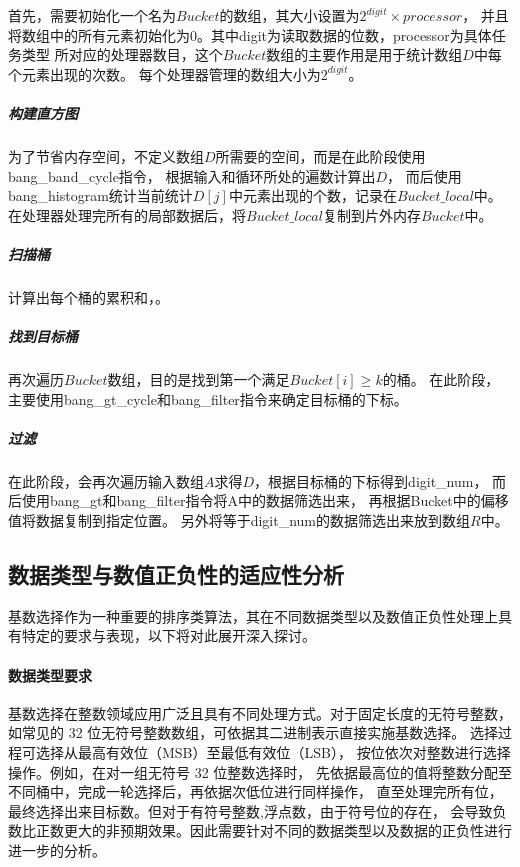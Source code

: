 首先，需要初始化一个名为\(Bucket\)的数组，其大小设置为\(2^{digit} \times processor\)，
并且将数组中的所有元素初始化为\(0\)。其中digit为读取数据的位数，processor为具体任务类型
所对应的处理器数目，这个\(Bucket\)数组的主要作用是用于统计数组\(D\)中每个元素出现的次数。
每个处理器管理的数组大小为\(2^{digit}\)。
\subparagraph{构建直方图}

为了节省内存空间，不定义数组\(D\)所需要的空间，而是在此阶段使用bang\_band\_cycle指令，
根据输入和循环所处的遍数计算出\(D\)，
而后使用bang\_histogram统计当前统计\(D[j]\)中元素出现的个数，记录在\(Bucket\_local\)中。
在处理器处理完所有的局部数据后，将\(Bucket\_local\)复制到片外内存\(Bucket\)中。

\subparagraph{扫描桶}

计算出每个桶的累积和，。

\subparagraph{找到目标桶}

再次遍历\(Bucket\)数组，目的是找到第一个满足\(Bucket[i] \geq k\)的桶。
在此阶段，主要使用bang\_gt\_cycle和bang\_filter指令来确定目标桶的下标。

\subparagraph{过滤}

在此阶段，会再次遍历输入数组\(A\)求得\(D\)，根据目标桶的下标得到digit\_num，
而后使用bang\_gt和bang\_filter指令将A中的数据筛选出来，
再根据Bucket中的偏移值将数据复制到指定位置。
另外将等于digit\_num的数据筛选出来放到数组\(R\)中。


\subsection{数据类型与数值正负性的适应性分析}


基数选择作为一种重要的排序类算法，其在不同数据类型以及数值正负性处理上具有特定的要求与表现，以下将对此展开深入探讨。

\paragraph{数据类型要求}

基数选择在整数领域应用广泛且具有不同处理方式。对于固定长度的无符号整数，
如常见的 32 位无符号整数数组，可依据其二进制表示直接实施基数选择。
选择过程可选择从最高有效位（MSB）至最低有效位（LSB），
按位依次对整数进行选择操作。例如，在对一组无符号 32 位整数选择时，
先依据最高位的值将整数分配至不同桶中，完成一轮选择后，再依据次低位进行同样操作，
直至处理完所有位，最终选择出来目标数。但对于有符号整数,浮点数，由于符号位的存在，
会导致负数比正数更大的非预期效果。因此需要针对不同的数据类型以及数据的正负性进行
进一步的分析。

